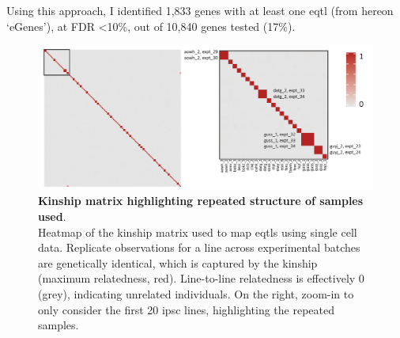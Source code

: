 Using this approach, I identified 1,833 genes with at least one \gls{eqtl} (from hereon `eGenes'), at FDR <10\%, out of 10,840 genes tested (17\%). 

\begin{figure}[h]
\centering
\includegraphics[width=14.5cm]{Chapter3/Fig/kinship_repeatedness.png}
\caption[Kinship for repeated samples]{\textbf{Kinship matrix highlighting repeated structure of samples used}.\\
Heatmap of the kinship matrix used to map \glspl{eqtl} using single cell data.
Replicate observations for a line across experimental batches are genetically identical, which is captured by the kinship (maximum relatedness, red).
Line-to-line relatedness is effectively 0 (grey), indicating unrelated individuals. 
On the right, zoom-in to only consider the first 20 \gls{ipsc} lines, highlighting the repeated samples.}
\label{fig:kinship_repeats}
\end{figure}








